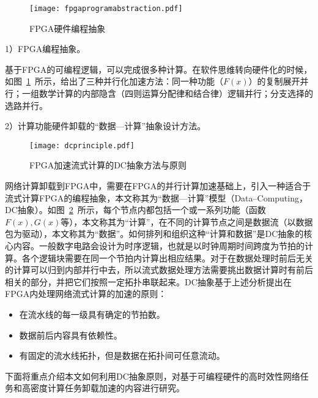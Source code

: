 \begin{figure}[!ht]
	\centering 
	\vspace{-1.5mm}
	\texttt{[image: fpgaprogramabstraction.pdf]}
	\caption{FPGA硬件编程抽象} \label{fig:fpgaprogramabstraction}
\end{figure}

1）FPGA编程抽象。
		
基于FPGA的可编程逻辑，可以完成很多种计算。在软件思维转向硬件化的时候，如图~\ref{fig:fpgaprogramabstraction}~所示，给出了三种并行化加速方法：同一种功能（$F(x)$）的复制展开并行；一组数学计算的内部隐含（四则运算分配律和结合律）逻辑并行；分支选择的选路并行。



2）计算功能硬件卸载的“数据---计算”抽象设计方法。

\begin{figure}[!ht]
	\centering 
	\vspace{-1.5mm}
	\texttt{[image: dcprinciple.pdf]}
	\caption{FPGA加速流式计算的DC抽象方法与原则} \label{fig:dcprinciple}
\end{figure}

网络计算卸载到FPGA中，需要在FPGA的并行计算加速基础上，引入一种适合于流式计算FPGA的编程抽象，本文称其为“数据---计算”模型（Data--Computing，DC抽象）。如图~\ref{fig:dcprinciple}~所示，每个节点内都包括一个或一系列功能（函数$F(x), G(x)$等），本文称其为“计算”，在不同的计算节点之间是数据流（以数据包为驱动），本文称其为“数据”。如何排列和组织这种“计算和数据”是DC抽象的核心内容。一般数字电路会设计为时序逻辑，也就是以时钟周期时间跨度为节拍的计算。各个逻辑块需要在同一个节拍内计算出相应结果。对于在数据处理时前后无关的计算可以归到内部并行中去，所以流式数据处理方法需要挑出数据计算时有前后相关的部分，并把它们按照一定拓扑串联起来。DC抽象基于上述分析提出在FPGA内处理网络流式计算的加速的原则：

\begin{itemize}
	\item 在流水线的每一级具有确定的节拍数。
	\item 数据前后内容具有依赖性。%
	\item 有固定的流水线拓扑，但是数据在拓扑间可任意流动。
\end{itemize}

下面将重点介绍本文如何利用DC抽象原则，对基于可编程硬件的高时效性网络任务和高密度计算任务卸载加速的内容进行研究。







